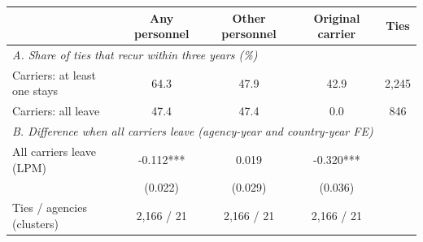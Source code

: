 \begin{tabular}{lcccc}
\toprule
 & Any personnel & Other personnel & Original carrier & Ties \\
\midrule
\multicolumn{5}{l}{\emph{A. Share of ties that recur within three years (\%)}} \\
Carriers: at least one stays & 64.3 & 47.9 & 42.9 & 2,245 \\
Carriers: all leave & 47.4 & 47.4 & 0.0 & 846 \\
\midrule
\multicolumn{5}{l}{\emph{B. Difference when all carriers leave (agency-year and country-year FE)}} \\
All carriers leave (LPM) & -0.112*** & 0.019 & -0.320*** &  \\
 & (0.022) & (0.029) & (0.036) &  \\
Ties / agencies (clusters) & 2,166 / 21 & 2,166 / 21 & 2,166 / 21 &  \\
\bottomrule
\end{tabular}
